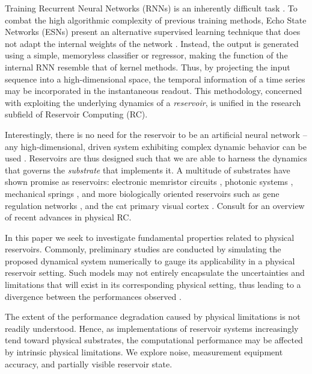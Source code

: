 Training Recurrent Neural Networks (RNNs) is an inherently difficult task
\cite{bengio_learning_1994}. To combat the high algorithmic complexity of
previous training methods, Echo State Networks (ESNs) present an alternative
supervised learning technique that does not adapt the internal weights of the
network \cite{jaeger_echo_2001}. Instead, the output is generated using a
simple, memoryless classifier or regressor, making the function of the internal
RNN resemble that of kernel methods. Thus, by projecting the input sequence into
a high-dimensional space, the temporal information of a time series may be
incorporated in the instantaneous readout. This methodology, concerned with
exploiting the underlying dynamics of a \textit{reservoir}, is unified in the
research subfield of Reservoir Computing (RC).

Interestingly, there is no need for the reservoir to be an artificial neural
network -- any high-dimensional, driven system exhibiting complex dynamic
behavior can be used \cite{schrauwen_overview_2007}. Reservoirs are thus
designed such that we are able to harness the dynamics that governs the
\textit{substrate} that implements it. A multitude of substrates have shown
promise as reservoirs: electronic memristor circuits
\cite{kulkarni_memristor-based_2012}, photonic systems
\cite{vandoorne_experimental_2014}, mechanical springs
\cite{hauser_towards_2011}, and more biologically oriented reservoirs such as
gene regulation networks \cite{jones_is_2007}, and the cat primary visual cortex
\cite{scholkopf_temporal_2007}. Consult \cite{tanaka_recent_2018} for an
overview of recent advances in physical RC.

In this paper we seek to investigate fundamental properties related to physical
reservoirs. Commonly, preliminary studies are conducted by simulating the
proposed dynamical system numerically to gauge its applicability in a physical
reservoir setting. Such models may not entirely encapsulate the uncertainties
and limitations that will exist in its corresponding physical setting, thus
leading to a divergence between the performances observed
\cite{vandoorne_experimental_2014, katumba_neuromorphic_2018,
  jensen_reservoir_2017}.

The extent of the performance degradation caused by physical limitations is not
readily understood. Hence, as implementations of reservoir systems increasingly
tend toward physical substrates, the computational performance may be affected
by intrinsic physical limitations. We explore noise, measurement equipment
accuracy, and partially visible reservoir state.

